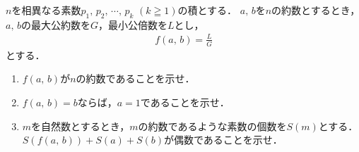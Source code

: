 \documentclass[../../main.tex]{subfiles}
\begin{document}
$n$を相異なる素数$p_1, \, p_2, \, \cdots, \, p_k$ $(k\geqq1)$の積とする．
$a, \, b$を$n$の約数とするとき，$a, \, b$の最大公約数を$G$，最小公倍数を$L$とし，
\begin{align*}
  f(a, \, b)=\frac{L}{G}
\end{align*}
とする．
\begin{enumerate}
  \item $f(a, \, b)$が$n$の約数であることを示せ．
  \item $f(a, \, b)=b$ならば，$a=1$であることを示せ．
  \item $m$を自然数とするとき，$m$の約数であるような素数の個数を$S(m)$とする．
    $S(f(a, \, b))+S(a)+S(b)$が偶数であることを示せ．
\end{enumerate}
\end{document}
